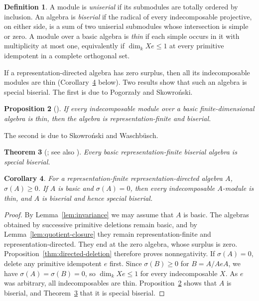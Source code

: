 \documentclass[a4paper,reqno,10pt]{amsart}
\newtheorem{theorem}{Theorem}[section]
\newtheorem{proposition}[theorem]{Proposition}
\newtheorem{corollary}[theorem]{Corollary}
\theoremstyle{definition}
\newtheorem{definition}[theorem]{Definition}
\numberwithin{equation}{section}
\begin{document}
\begin{definition}\label{def:biserial}
A module is \emph{uniserial} if its submodules are totally ordered by
inclusion. An algebra is \emph{biserial} if the radical of every
indecomposable projective, on either side, is a sum of two uniserial
submodules whose intersection is simple or zero. A module over a basic
algebra is \emph{thin} if each simple occurs in it with multiplicity
at most one, equivalently if \(\dim_k Xe\leq1\) at every primitive
idempotent in a complete orthogonal set.
\end{definition}
If a representation-directed algebra has zero surplus, then all its
indecomposable modules are thin (Corollary~\ref{cor:directed} below).
Two results show that such an algebra is special biserial. The first is
due to Pogorza{\l}y and Skowro\'nski.

\begin{proposition}[{\cite[Proposition~1]{PS}}]\label{prop:thin-biserial}
If every indecomposable module over a basic finite-dimensional algebra is
thin, then the algebra is representation-finite and biserial.
\end{proposition}

The second is due to Skowro\'nski and Waschb\"usch.
\begin{theorem}[{\cite[p.~173 and Lemma~2]{SW}; see also \cite[Theorem~2]{PS}}]\label{thm:biserial-special}
Every basic representation-finite biserial algebra is special biserial.
\end{theorem}

\begin{corollary}\label{cor:directed}
For a representation-finite representation-directed algebra \(A\),
\(\sigma(A)\geq0\). If \(A\) is basic and \(\sigma(A)=0\), then every
indecomposable \(A\)-module is thin, and \(A\) is biserial and hence
special biserial.
\end{corollary}
\begin{proof}
By Lemma~\ref{lem:invariance} we may assume that \(A\) is basic. The
algebras obtained by successive primitive deletions remain basic, and by Lemma~\ref{lem:quotient-closure}
they remain representation-finite and representation-directed. They end at
the zero algebra, whose surplus is zero. Proposition~\ref{thm:directed-deletion}
therefore proves nonnegativity. If \(\sigma(A)=0\), delete any primitive
idempotent \(e\) first. Since \(\sigma(B)\geq0\) for \(B=A/AeA\), we have
\(\sigma(A)=\sigma(B)=0\), so \(\dim_k Xe\leq1\) for every indecomposable \(X\).
As \(e\) was arbitrary, all indecomposables are thin.
Proposition~\ref{prop:thin-biserial} shows that \(A\) is biserial, and
Theorem~\ref{thm:biserial-special} that it is special biserial.
\end{proof}
\end{document}
